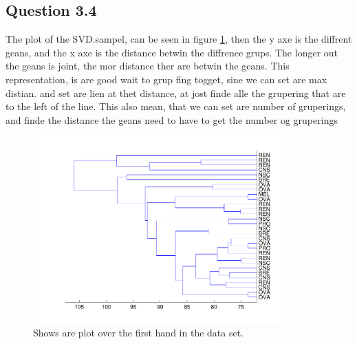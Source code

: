 \subsection*{Question 3.4}
The plot of the SVD.sampel, can be seen in figure \ref{fig:q34}, then the y axe is the diffrent geans, and the x axe is the distance betwin the diffrence grups. The longer out the geans is joint, the mor distance ther are betwin the geans. This representation, is are good wait to grup fing togget, sine we can set are max distian. and set are lien at thet distance, at jost finde alle the grupering that are to the left of the line. This also mean, that we can set are number of gruperings, and finde the distance the geans need to have to get the number og gruperings
\begin{figure}[!htbp]
  \centering
  \includegraphics[width=0.85\textwidth]{./images/q34}
  \caption{Shows are plot over the first hand in the data set.}
  \label{fig:q34}
\end{figure}


